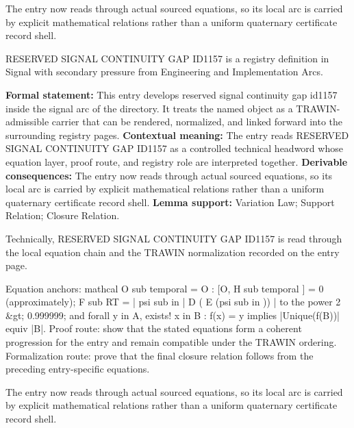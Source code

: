 The entry now reads through actual sourced equations, so its local arc is carried by explicit mathematical relations rather than a uniform quaternary certificate record shell.
\clearpage


\begingroup\small
{}
RESERVED SIGNAL CONTINUITY GAP ID1157 is a registry definition in Signal with secondary pressure from Engineering and Implementation Arcs.

\begingroup\footnotesize\setlength{\emergencystretch}{3em}\sloppy
\textbf{Formal statement:} This entry develops reserved signal continuity gap id1157 inside the signal arc of the directory. It treats the named object as a TRAWIN-admissible carrier that can be rendered, normalized, and linked forward into the surrounding registry pages. \textbf{Contextual meaning:} The entry reads RESERVED SIGNAL CONTINUITY GAP ID1157 as a controlled technical headword whose equation layer, proof route, and registry role are interpreted together. \textbf{Derivable consequences:} The entry now reads through actual sourced equations, so its local arc is carried by explicit mathematical relations rather than a uniform quaternary certificate record shell. \textbf{Lemma support:} Variation Law; Support Relation; Closure Relation.\par
\endgroup

Technically, RESERVED SIGNAL CONTINUITY GAP ID1157 is read through the local equation chain and the TRAWIN normalization recorded on the entry page.

Equation anchors: mathcal O sub temporal = O : [O, H sub temporal ] = 0 (approximately); F sub RT = | psi sub in | D ( E (psi sub in )) | to the power 2 \&gt; 0.999999; and forall y in A, exists! x in B : f(x) = y implies |Unique(f(B))| equiv |B|. Proof route: show that the stated equations form a coherent progression for the entry and remain compatible under the TRAWIN ordering. Formalization route: prove that the final closure relation follows from the preceding entry-specific equations.

The entry now reads through actual sourced equations, so its local arc is carried by explicit mathematical relations rather than a uniform quaternary certificate record shell.
\endgroup

